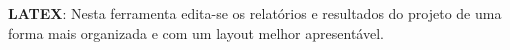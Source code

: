 \textbf{LATEX}:
Nesta ferramenta edita-se os relatórios e resultados do projeto de uma forma mais organizada e com um layout melhor apresentável.






%
%
%
%
%


